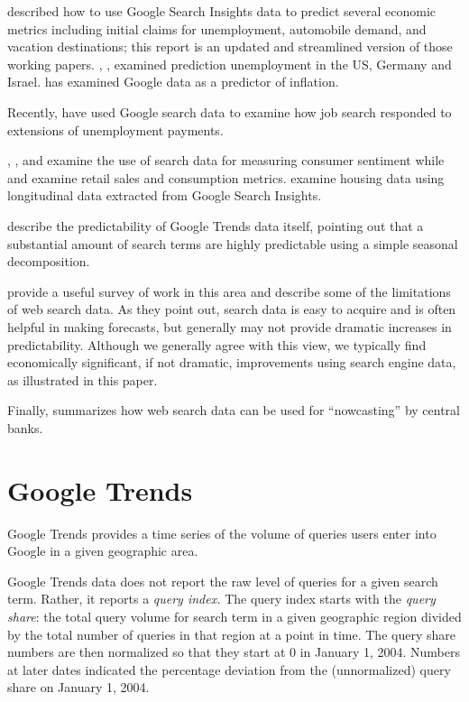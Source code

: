 \documentclass[12pt, oneside]{article}
\begin{document}
\citet{Choi09a, Choi09b} described how to use Google Search Insights
data to predict several economic metrics including initial claims for
unemployment, automobile demand, and vacation destinations; this
report is an updated and streamlined version of those working papers.
\citet{Askitas10}, \citet{Damuri10}, \citet{Suhoy09} examined
prediction unemployment in the US, Germany and Israel.
\citet{Guzman11} has examined Google data as a predictor of inflation.

Recently, \citet{Baker11} have used Google search data to examine how job search responded to extensions of unemployment payments.

\citet{Radinsky09}, \citet{Huang10}, and \citet{Preis10} examine the
use of search data for measuring consumer sentiment while
\citet{Schmidt09} and \citet{Lindberg11} examine retail sales and
consumption metrics.  \citet{Wu10} examine housing data using
longitudinal data extracted from Google Search Insights.

\citet{Shimshoni10} describe the predictability of Google Trends data
itself, pointing out that a substantial amount of search terms are
highly predictable using a simple seasonal decomposition.

\citet{Goel10} provide a useful survey of work in this area and
describe some of the limitations of web search data.  As they point
out, search data is easy to acquire and is often helpful in making
forecasts, but generally may not provide dramatic increases in
predictability.  Although we generally agree with this view, we
typically find economically significant, if not dramatic, improvements
using search engine data, as illustrated in this paper.

Finally, \citet{BOE11} summarizes how web search data can be used for
``nowcasting'' by central banks.

\section{Google Trends\label{trends}}  

Google Trends provides a time series of the volume of queries users
enter into Google in a given geographic area.

Google Trends data does not report the raw level of queries for a
given search term.  Rather, it reports a {\it query index.}  The query
index starts with the {\it query share}: the total query volume for
search term in a given geographic region divided by the total number
of queries in that region at a point in time.  The query share numbers
are then normalized so that they start at 0 in January 1,
2004. Numbers at later dates indicated the percentage deviation from
the (unnormalized) query share on January 1, 2004.
\end{document}
